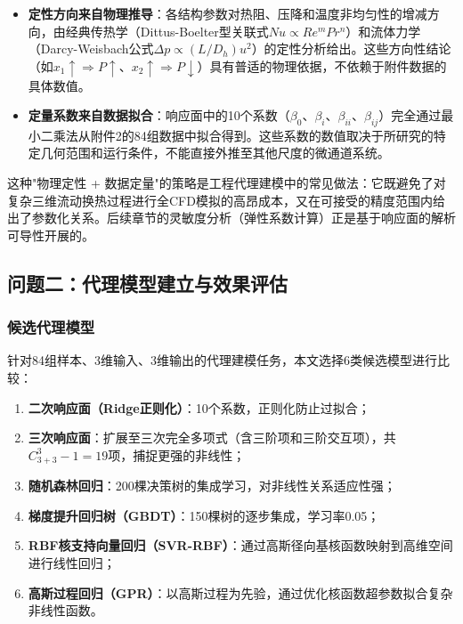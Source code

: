 \documentclass[12pt,a4paper]{ctexart}
\begin{document}
\begin{itemize}
\item \textbf{定性方向来自物理推导}：各结构参数对热阻、压降和温度非均匀性的增减方向，由经典传热学（Dittus-Boelter型关联式$Nu \propto Re^{m}Pr^{n}$）和流体力学（Darcy-Weisbach公式$\Delta p \propto (L/D_h)u^2$）的定性分析给出。这些方向性结论（如$x_1 \uparrow \Rightarrow P \uparrow$、$x_2 \uparrow \Rightarrow P \downarrow$）具有普适的物理依据，不依赖于附件数据的具体数值。
\item \textbf{定量系数来自数据拟合}：响应面中的10个系数（$\beta_0$、$\beta_i$、$\beta_{ii}$、$\beta_{ij}$）完全通过最小二乘法从附件2的84组数据中拟合得到。这些系数的数值取决于所研究的特定几何范围和运行条件，不能直接外推至其他尺度的微通道系统。
\end{itemize}

这种"物理定性 + 数据定量"的策略是工程代理建模中的常见做法：它既避免了对复杂三维流动换热过程进行全CFD模拟的高昂成本，又在可接受的精度范围内给出了参数化关系。后续章节的灵敏度分析（弹性系数计算）正是基于响应面的解析可导性开展的。

\subsection{问题二：代理模型建立与效果评估}

\subsubsection{候选代理模型}

针对84组样本、3维输入、3维输出的代理建模任务，本文选择6类候选模型进行比较：

\begin{enumerate}
\item \textbf{二次响应面（Ridge正则化）}：10个系数，正则化防止过拟合；
\item \textbf{三次响应面}：扩展至三次完全多项式（含三阶项和三阶交互项），共$C_{3+3}^{3}-1=19$项，捕捉更强的非线性；
\item \textbf{随机森林回归}：200棵决策树的集成学习，对非线性关系适应性强；
\item \textbf{梯度提升回归树（GBDT）}：150棵树的逐步集成，学习率0.05；
\item \textbf{RBF核支持向量回归（SVR-RBF）}：通过高斯径向基核函数映射到高维空间进行线性回归；
\item \textbf{高斯过程回归（GPR）}：以高斯过程为先验，通过优化核函数超参数拟合复杂非线性函数。
\end{enumerate}
\end{document}
